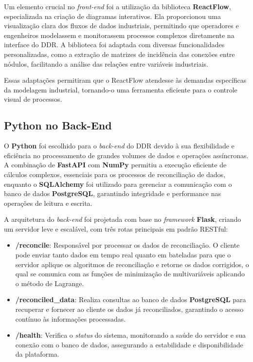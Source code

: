 Um elemento crucial no \textit{front-end} foi a utilização da biblioteca \textbf{ReactFlow}, especializada na criação de diagramas interativos. Ela proporcionou uma visualização clara dos fluxos de dados industriais, permitindo que operadores e engenheiros modelassem e monitorassem processos complexos diretamente na interface do DDR. A biblioteca foi adaptada com diversas funcionalidades personalizadas, como a extração de matrizes de incidência das conexões entre nódulos, facilitando a análise das relações entre variáveis industriais.

Essas adaptações permitiram que o ReactFlow atendesse às demandas específicas da modelagem industrial, tornando-o uma ferramenta eficiente para o controle visual de processos.

\subsection{Python no Back-End}

O \textbf{Python} foi escolhido para o \textit{back-end} do DDR devido à sua flexibilidade e eficiência no processamento de grandes volumes de dados e operações assíncronas. A combinação de \textbf{FastAPI} com \textbf{NumPy} permitiu a execução eficiente de cálculos complexos, essenciais para os processos de reconciliação de dados, enquanto o \textbf{SQLAlchemy} foi utilizado para gerenciar a comunicação com o banco de dados \textbf{PostgreSQL}, garantindo integridade e performance nas operações de leitura e escrita.

A arquitetura do \textit{back-end} foi projetada com base no \textit{framework} \textbf{Flask}, criando um servidor leve e escalável, com três rotas principais em padrão RESTful:

\begin{itemize}
    \item \textbf{/reconcile}: Responsável por processar os dados de reconciliação. O cliente pode enviar tanto dados em tempo real quanto em bateladas para que o servidor aplique os algoritmos de reconciliação e retorne os dados corrigidos, o qual se comunica com as funções de minimização de multivariáveis aplicando o método de Lagrange.
    \item \textbf{/reconciled\_data}: Realiza consultas ao banco de dados \textbf{PostgreSQL} para recuperar e fornecer ao cliente os dados já reconciliados, garantindo o acesso contínuo às informações processadas.
    \item \textbf{/health}: Verifica o \textit{status} do sistema, monitorando a saúde do servidor e sua conexão com o banco de dados, assegurando a estabilidade e disponibilidade da plataforma.
\end{itemize}

